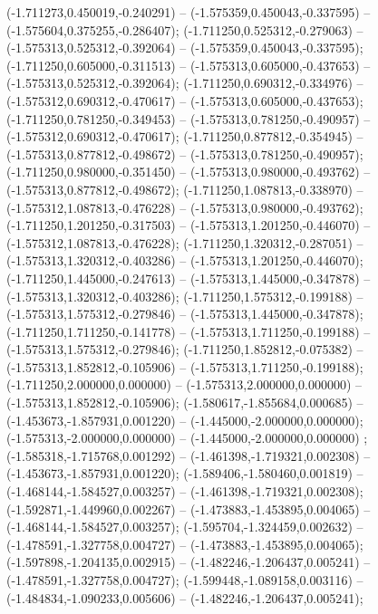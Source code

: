  (-1.711273,0.450019,-0.240291) -- (-1.575359,0.450043,-0.337595) -- (-1.575604,0.375255,-0.286407);
 (-1.711250,0.525312,-0.279063) -- (-1.575313,0.525312,-0.392064) -- (-1.575359,0.450043,-0.337595);
 (-1.711250,0.605000,-0.311513) -- (-1.575313,0.605000,-0.437653) -- (-1.575313,0.525312,-0.392064);
 (-1.711250,0.690312,-0.334976) -- (-1.575312,0.690312,-0.470617) -- (-1.575313,0.605000,-0.437653);
 (-1.711250,0.781250,-0.349453) -- (-1.575313,0.781250,-0.490957) -- (-1.575312,0.690312,-0.470617);
 (-1.711250,0.877812,-0.354945) -- (-1.575313,0.877812,-0.498672) -- (-1.575313,0.781250,-0.490957);
 (-1.711250,0.980000,-0.351450) -- (-1.575313,0.980000,-0.493762) -- (-1.575313,0.877812,-0.498672);
 (-1.711250,1.087813,-0.338970) -- (-1.575312,1.087813,-0.476228) -- (-1.575313,0.980000,-0.493762);
 (-1.711250,1.201250,-0.317503) -- (-1.575313,1.201250,-0.446070) -- (-1.575312,1.087813,-0.476228);
 (-1.711250,1.320312,-0.287051) -- (-1.575313,1.320312,-0.403286) -- (-1.575313,1.201250,-0.446070);
 (-1.711250,1.445000,-0.247613) -- (-1.575313,1.445000,-0.347878) -- (-1.575313,1.320312,-0.403286);
 (-1.711250,1.575312,-0.199188) -- (-1.575313,1.575312,-0.279846) -- (-1.575313,1.445000,-0.347878);
 (-1.711250,1.711250,-0.141778) -- (-1.575313,1.711250,-0.199188) -- (-1.575313,1.575312,-0.279846);
 (-1.711250,1.852812,-0.075382) -- (-1.575313,1.852812,-0.105906) -- (-1.575313,1.711250,-0.199188);
 (-1.711250,2.000000,0.000000) -- (-1.575313,2.000000,0.000000) -- (-1.575313,1.852812,-0.105906);
 (-1.580617,-1.855684,0.000685) -- (-1.453673,-1.857931,0.001220) -- (-1.445000,-2.000000,0.000000);
 (-1.575313,-2.000000,0.000000) -- (-1.445000,-2.000000,0.000000) ;
 (-1.585318,-1.715768,0.001292) -- (-1.461398,-1.719321,0.002308) -- (-1.453673,-1.857931,0.001220);
 (-1.589406,-1.580460,0.001819) -- (-1.468144,-1.584527,0.003257) -- (-1.461398,-1.719321,0.002308);
 (-1.592871,-1.449960,0.002267) -- (-1.473883,-1.453895,0.004065) -- (-1.468144,-1.584527,0.003257);
 (-1.595704,-1.324459,0.002632) -- (-1.478591,-1.327758,0.004727) -- (-1.473883,-1.453895,0.004065);
 (-1.597898,-1.204135,0.002915) -- (-1.482246,-1.206437,0.005241) -- (-1.478591,-1.327758,0.004727);
 (-1.599448,-1.089158,0.003116) -- (-1.484834,-1.090233,0.005606) -- (-1.482246,-1.206437,0.005241);
